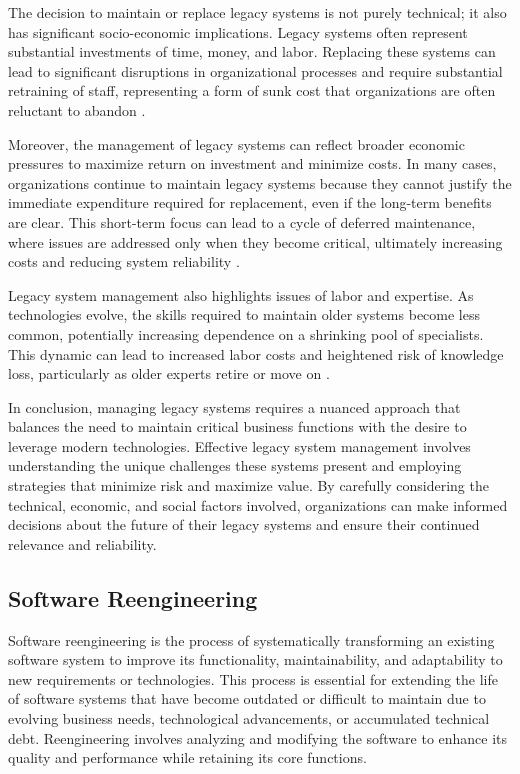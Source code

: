 \begin{refsection}
The decision to maintain or replace legacy systems is not purely technical; it also has significant socio-economic implications. Legacy systems often represent substantial investments of time, money, and labor. Replacing these systems can lead to significant disruptions in organizational processes and require substantial retraining of staff, representing a form of sunk cost that organizations are often reluctant to abandon \cite[pp.~3-5]{chapin2001types}.

Moreover, the management of legacy systems can reflect broader economic pressures to maximize return on investment and minimize costs. In many cases, organizations continue to maintain legacy systems because they cannot justify the immediate expenditure required for replacement, even if the long-term benefits are clear. This short-term focus can lead to a cycle of deferred maintenance, where issues are addressed only when they become critical, ultimately increasing costs and reducing system reliability \cite[pp.~209-213]{bisbal1999legacy}.

Legacy system management also highlights issues of labor and expertise. As technologies evolve, the skills required to maintain older systems become less common, potentially increasing dependence on a shrinking pool of specialists. This dynamic can lead to increased labor costs and heightened risk of knowledge loss, particularly as older experts retire or move on \cite[pp.~77-78]{brodie2001legacy}.

In conclusion, managing legacy systems requires a nuanced approach that balances the need to maintain critical business functions with the desire to leverage modern technologies. Effective legacy system management involves understanding the unique challenges these systems present and employing strategies that minimize risk and maximize value. By carefully considering the technical, economic, and social factors involved, organizations can make informed decisions about the future of their legacy systems and ensure their continued relevance and reliability.

\subsection{Software Reengineering}

Software reengineering is the process of systematically transforming an existing software system to improve its functionality, maintainability, and adaptability to new requirements or technologies. This process is essential for extending the life of software systems that have become outdated or difficult to maintain due to evolving business needs, technological advancements, or accumulated technical debt. Reengineering involves analyzing and modifying the software to enhance its quality and performance while retaining its core functions.


\end{refsection}
